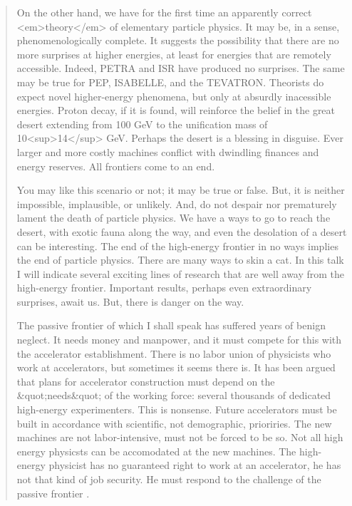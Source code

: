 \begin{quote}
     On the other hand, we have for the first time an apparently 
     correct <em>theory</em> of elementary particle physics.  It may be, in
     a sense, phenomenologically complete.  It suggests the possibility
     that there are no more surprises at higher energies, at least for
     energies that are remotely accessible.  Indeed, PETRA and ISR have
     produced no surprises.  The same may be true for PEP, ISABELLE, and
     the TEVATRON.  Theorists do expect novel higher-energy phenomena,
     but only at absurdly inacessible energies.  Proton decay, if it is 
     found, will reinforce the belief in the great desert extending from
     100 GeV to the unification mass of 10<sup>14</sup> GeV.  Perhaps 
     the desert
     is a blessing in disguise.  Ever larger and more costly machines
     conflict with dwindling finances and energy reserves.  All frontiers
     come to an end.  

     You may like this scenario or not; it may be true or false.  But,
     it is neither impossible, implausible, or unlikely.  And, do not 
     despair nor prematurely lament the death of particle physics.  We
     have a ways to go to reach the desert, with exotic fauna along the
     way, and even the desolation of a desert can be interesting.  The
     end of the high-energy frontier in no ways implies the end of 
     particle physics.  There are many ways to skin a cat.  In this talk
     I will indicate several exciting lines of research that are well 
     away from the high-energy frontier.  Important results, perhaps even
     extraordinary surprises, await us.  But, there is danger on the way.

     The passive frontier of which I shall speak has suffered years of
     benign neglect.  It needs money and manpower, and it must compete
     for this with the accelerator establishment.  There is no labor
     union of physicists who work at accelerators, but sometimes it seems
     there is.  It has been argued that plans for accelerator construction
     must depend on the &quot;needs&quot; of the working force: several thousands
     of dedicated high-energy experimenters.  This is nonsense.  Future
     accelerators must be built in accordance with scientific, not 
     demographic, prioriries.  The new machines are not labor-intensive, 
     must not be forced to be so.  Not all high energy physicsts can be
     accomodated at the new machines.  The high-energy physicist has no
     guaranteed right to work at an accelerator, he has not that kind of
     job security.  He must respond to the challenge of the passive
     frontier
.
\end{quote}
    
